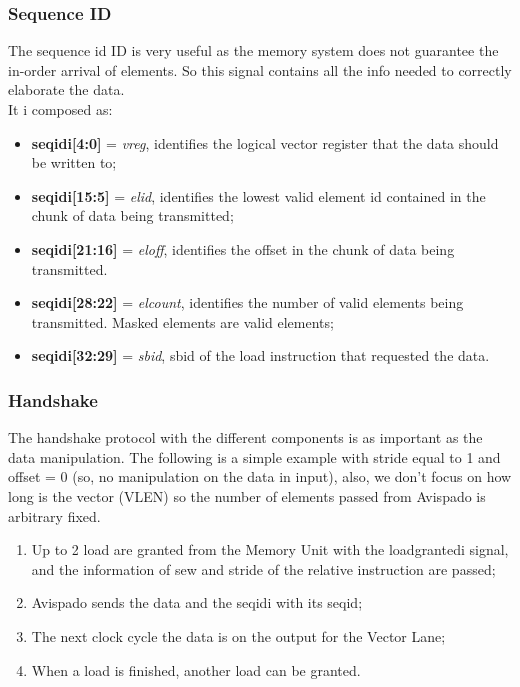 \subsubsection{Sequence ID}
The sequence id ID is very useful as the memory system does not guarantee the in-order arrival of elements. So this signal contains all the info needed to correctly elaborate the data.\\

It i composed as:
\begin{itemize}
    \item \textbf{seq\+id\+i[4:0]} = \textit{v\+reg}, identifies the logical vector register that the data should be written to;
    
    \item \textbf{seq\+id\+i[15:5]} = \textit{el\+id}, identifies the lowest valid element id contained in the chunk of data being transmitted;
    
    \item \textbf{seq\+id\+i[21:16]} = \textit{el\+off}, identifies the offset in the chunk of data being transmitted.
    
    \item \textbf{seq\+id\+i[28:22]} = \textit{el\+count}, identifies the number of valid elements being transmitted. Masked elements are valid elements; 
    
    \item \textbf{seq\+id\+i[32:29]} = \textit{sb\+id}, sb\+id of the load instruction that requested the data.
\end{itemize}


\subsubsection{Handshake}
The handshake protocol with the different components is as important as the data manipulation. The following is a simple example with stride equal to 1 and offset = 0 (so, no manipulation on the data in input), also, we don't focus on how long is the vector (VLEN) so the number of elements passed from Avispado is arbitrary fixed.

\begin{enumerate}
    \item Up to 2 load are granted from the Memory Unit with the load\+granted\+i signal, and the information of sew and stride of the relative instruction are passed;
    
    \item Avispado sends the data and the seq\+id\+i with its seq\+id;
    
    \item The next clock cycle the data is on the output for the Vector Lane;
    
    \item When a load is finished, another load can be granted.
\end{enumerate}

